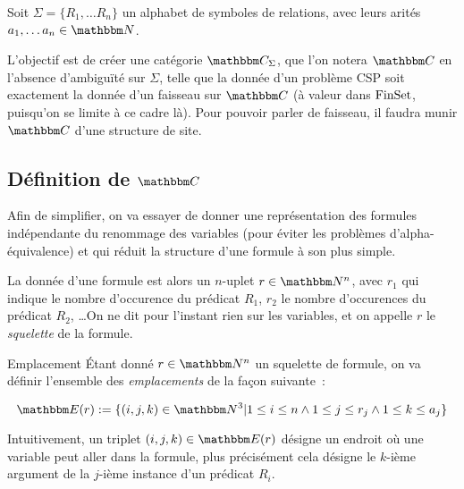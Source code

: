 

Soit $\Sigma = \{R_1, \dots R_n\}$ un alphabet de symboles de relations, avec
leurs arités $a_1, \dots a_n\in\N$.

L'objectif est de créer une catégorie $\C_\Sigma$, que l'on notera $\C$ en l'absence
d'ambiguïté sur $\Sigma$, telle que la donnée d'un problème CSP soit exactement la donnée
d'un faisseau sur $\C$ (à valeur dans $\text{FinSet}$, puisqu'on se limite à ce cadre là). Pour
pouvoir parler de faisseau, il faudra munir $\C$ d'une structure de site.

\subsection{Définition de $\C$}

Afin de simplifier, on va essayer de donner une représentation des formules indépendante
du renommage des variables (pour éviter les problèmes d'alpha-équivalence) et qui réduit
la structure d'une formule à son plus simple.

La donnée d'une formule est alors un $n$-uplet $r\in\N^n$, avec $r_1$ qui indique le
nombre d'occurence du prédicat $R_1$, $r_2$ le nombre d'occurences du prédicat $R_2$,
\dots On ne dit pour l'instant rien sur les variables, et on appelle $r$ le 
\emph{squelette} de la formule.

\begin{defi}{Emplacement}
    Étant donné $r\in\N^n$ un squelette de formule, on va définir l'ensemble des
    \emph{emplacements} de la façon suivante~:

    \[ \E(r):= \{(i,j,k)\in\N^3 |        1\leq i\leq n
                                  \wedge 1\leq j\leq r_j
                                  \wedge 1\leq k\leq a_j\} \]

    Intuitivement, un triplet $(i,j,k)\in\E(r)$ désigne un endroit où une variable peut
    aller dans la formule, plus précisément cela désigne le $k$-ième argument de la
    $j$-ième instance d'un prédicat $R_i$.
\end{defi}

